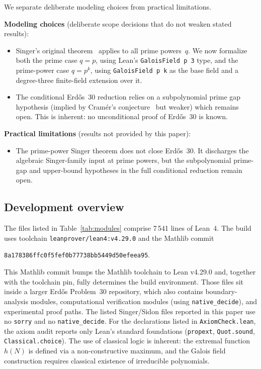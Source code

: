 \documentclass[11pt,a4paper]{article}
\begin{document}
We separate deliberate modeling choices from practical limitations.

\smallskip\noindent\textbf{Modeling choices} (deliberate scope decisions that do not weaken
stated results):
\begin{itemize}[nosep]
  \item Singer's original theorem~\cite{Singer1938} applies to all prime
    powers~$q$.  We now formalize both the prime case \(q=p\), using Lean's
    \texttt{GaloisField p 3} type, and the prime-power case \(q=p^k\), using
    \texttt{GaloisField p k} as the base field and a degree-three finite-field
    extension over it.
  \item The conditional Erd\H{o}s~30 reduction relies on a subpolynomial prime
    gap hypothesis (implied by Cram\'er's conjecture~\cite{Cramer1936} but weaker) which
    remains open.  This is inherent: no unconditional proof of Erd\H{o}s~30
    is known.
\end{itemize}

\smallskip\noindent\textbf{Practical limitations} (results not provided by this paper):
\begin{itemize}[nosep]
  \item The prime-power Singer theorem does not close Erd\H{o}s~30.  It
    discharges the algebraic Singer-family input at prime powers, but the
    subpolynomial prime-gap and upper-bound hypotheses in the full conditional
    reduction remain open.
\end{itemize}

\subsection{Development overview}

The files listed in Table~\ref{tab:modules} comprise 7\,541 lines of
Lean~4.  The build uses toolchain \texttt{leanprover/lean4:v4.29.0}
and the Mathlib commit
\begin{center}
\texttt{8a178386ffc0f5fef0b77738bb5449d50efeea95}.
\end{center}
This Mathlib commit bumps the Mathlib toolchain to Lean v4.29.0 and, together with the
toolchain pin, fully determines the build environment.  Those files sit inside a larger Erd\H{o}s Problem~30 repository,
which also contains boundary-analysis modules, computational verification
modules (using \texttt{native\_decide}), and experimental proof paths.  The
listed Singer/Sidon files reported in this paper use no \texttt{sorry} and no
\texttt{native\_decide}.  For the declarations listed in
\texttt{AxiomCheck.lean}, the axiom audit reports only Lean's standard
foundations (\texttt{propext}, \texttt{Quot.sound},
\texttt{Classical.choice}).  The use of classical logic is inherent: the
extremal function~$h(N)$ is defined via a non-constructive maximum, and the
Galois field construction requires classical existence of irreducible
polynomials.
\end{document}
